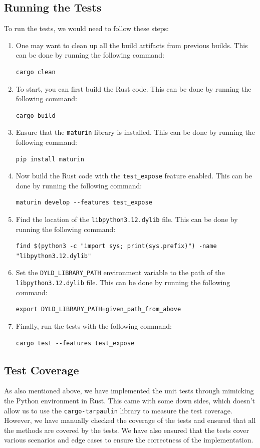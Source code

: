 \documentclass[review]{AIM_report}
\begin{document}
\subsection{Running the Tests}
To run the tests, we would need to follow these steps:
\begin{enumerate}
    \item One may want to clean up all the build artifacts from previous builds. This can be done by running the following command:
    \begin{verbatim}cargo clean
    \end{verbatim}
    \item To start, you can first build the Rust code. This can be done by running the following command:
    \begin{verbatim}cargo build
    \end{verbatim}
    \item Ensure that the \texttt{maturin} library is installed. This can be done by running the following command:
    \begin{verbatim}pip install maturin
    \end{verbatim}
    \item Now build the Rust code with the \texttt{test\_expose} feature enabled. This can be done by running the following command:
    \begin{verbatim}maturin develop --features test_expose
    \end{verbatim}
    \item Find the location of the \texttt{libpython3.12.dylib} file. This can be done by running the following command:
    \begin{verbatim}find $(python3 -c "import sys; print(sys.prefix)") -name "libpython3.12.dylib"
    \end{verbatim}
    \item Set the \texttt{DYLD\_LIBRARY\_PATH} environment variable to the path of the \texttt{libpython3.12.dylib} file. This can be done by running the following command:
    \begin{verbatim}export DYLD_LIBRARY_PATH=given_path_from_above
    \end{verbatim}
    \item Finally, run the tests with the following command:
    \begin{verbatim}cargo test --features test_expose
    \end{verbatim}
\end{enumerate}

\subsection{Test Coverage}
As also mentioned above, we have implemented the unit tests through mimicking the Python environment in Rust.
This came with some down sides, which doesn't allow us to use the \texttt{cargo-tarpaulin} library to measure the test coverage.
However, we have manually checked the coverage of the tests and ensured that all the methods are covered by the tests. We have also ensured that the tests cover various scenarios and edge cases to ensure the correctness of the implementation.
\end{document}
